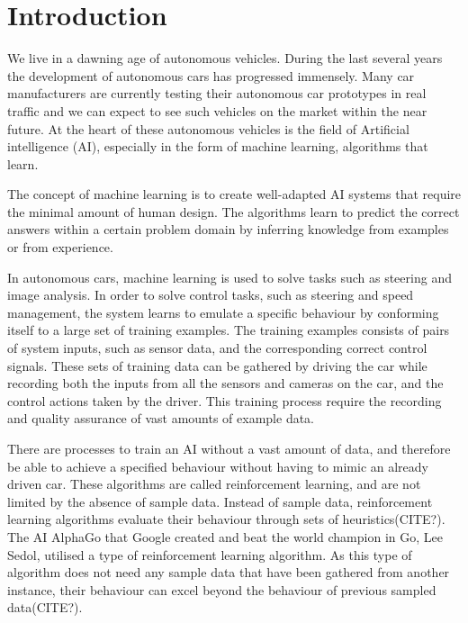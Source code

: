 \chapter{Introduction}


We live in a dawning age of autonomous vehicles. During the last several years the development of autonomous cars has progressed immensely. Many car manufacturers are currently testing their autonomous car prototypes in real traffic and we can expect to see such vehicles on the market within the near future. At the heart of these autonomous vehicles is the field of Artificial intelligence (AI), especially in the form of machine learning, algorithms that learn.

The concept of machine learning is to create well-adapted AI systems that require the minimal amount of human design. The algorithms learn to predict the correct answers within a certain problem domain by inferring knowledge from examples or from experience. 

In autonomous cars, machine learning is used to solve tasks such as steering and image analysis. In order to solve control tasks, such as steering and speed management, the system learns to emulate a specific behaviour by conforming itself to a large set of training examples. The training examples consists of pairs of system inputs, such as sensor data, and the corresponding correct control signals. These sets of training data can be gathered by driving the car while recording both the inputs from all the sensors and cameras on the car, and the control actions taken by the driver. This training process require the recording and quality assurance of vast amounts of example data.

There are processes to train an AI without a vast amount of data, and therefore be able to achieve a specified behaviour without having to mimic an already driven car. These algorithms are called reinforcement learning, and are not limited by the absence of sample data. Instead of sample data, reinforcement learning algorithms evaluate their behaviour through sets of heuristics(CITE?). The AI AlphaGo that Google created and beat the world champion in Go, Lee Sedol, utilised a type of reinforcement learning algorithm\cite{AlphaGo}. As this type of algorithm does not need any sample data that have been gathered from another instance, their behaviour can excel beyond the behaviour of previous sampled data(CITE?). 

